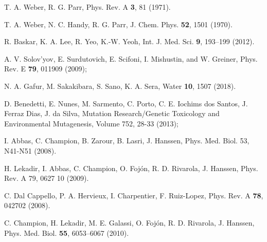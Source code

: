 \begin{thebibliography}{9}
T. A. Weber, R. G. Parr, 
Phys. Rev. A \textbf{3}, 81 (1971).

T. A. Weber, N. C. Handy, R. G. Parr, 
J. Chem. Phys. \textbf{52}, 1501 (1970).


R. Baskar, K. A. Lee, R. Yeo, K.-W. Yeoh,
Int. J. Med. Sci. \textbf{9}, 193--199 (2012).

A. V. Solov'yov, E. Surdutovich, E. Scifoni, I. Mishustin, and 
W. Greiner, 
Phys. Rev. E \textbf{79}, 011909 (2009);

N. A. Gafur, M.  Sakakibara, S. Sano, K. A. Sera, 
Water \textbf{10}, 1507 (2018).

D. Benedetti, E. Nunes, M. Sarmento, C. Porto, C. E. Iochims dos Santos, 
J. Ferraz Dias, J. da Silva,
Mutation Research/Genetic Toxicology and Environmental Mutagenesis,
Volume 752, 28-33 (2013);


I. Abbas, C. Champion, B. Zarour, B. Lasri, J. Hanssen,
Phys. Med. Biol. 53, N41-N51 (2008).

H. Lekadir, I. Abbas, C. Champion, O. Fojón, R. D. Rivarola, J. Hanssen,
Phys. Rev. A 79, 0627 10 (2009).

C. Dal Cappello, P. A. Hervieux, I. Charpentier, F. Ruiz-Lopez,
Phys. Rev. A \textbf{78}, 042702 (2008).

C. Champion, H. Lekadir, M. E. Galassi, O. Fojón, R. D. Rivarola, 
J. Hanssen,
Phys. Med. Biol. \textbf{55}, 6053--6067 (2010).


\end{thebibliography}

